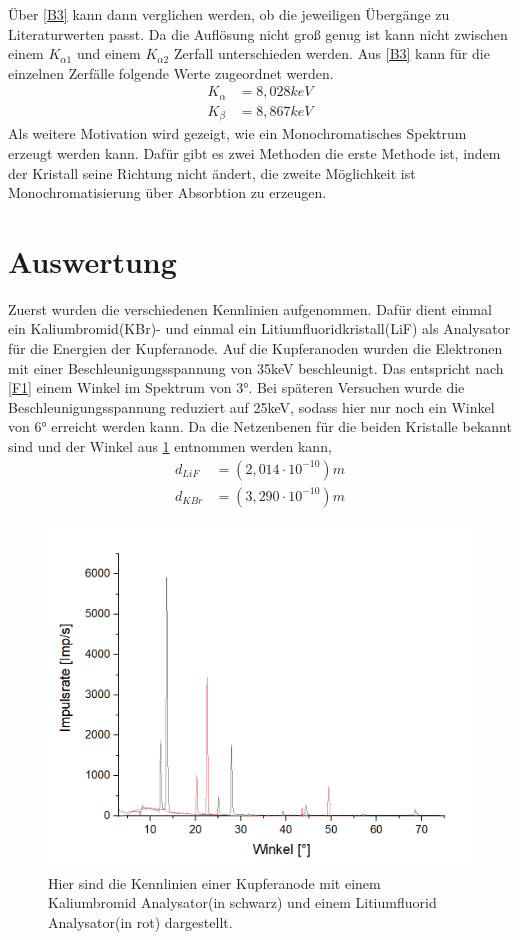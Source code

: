 \documentclass[
	a4paper,
	12pt,
	pagesize,
	ngerman
]{scrartcl}
\begin{document}
Über \cref{B3} kann dann verglichen werden, ob die jeweiligen Übergänge zu Literaturwerten passt. Da die Auflösung nicht groß genug ist kann nicht zwischen einem $K_{\alpha1}$ und einem $K_{\alpha2}$ Zerfall unterschieden werden. Aus \cref{B3} kann für die einzelnen Zerfälle folgende Werte zugeordnet werden.
\begin{align*}
    K_{\alpha} &= 8,028 keV \\
    K_{\beta} &= 8,867 keV
\end{align*}
Als weitere Motivation wird gezeigt, wie ein Monochromatisches Spektrum erzeugt werden kann. Dafür gibt es zwei Methoden die erste Methode ist, indem der Kristall seine Richtung nicht ändert, die zweite Möglichkeit ist Monochromatisierung über Absorbtion zu erzeugen.


\section{Auswertung}
Zuerst wurden die verschiedenen Kennlinien aufgenommen. Dafür dient einmal ein Kaliumbromid(KBr)- und einmal ein Litiumfluoridkristall(LiF) als Analysator für die Energien der Kupferanode. Auf die Kupferanoden wurden die Elektronen mit einer Beschleunigungsspannung von 35keV beschleunigt. Das entspricht nach \cref{F1} einem Winkel im Spektrum von 3°. Bei späteren Versuchen wurde die Beschleunigungsspannung reduziert auf 25keV, sodass hier nur noch ein Winkel von 6° erreicht werden kann. Da die Netzenbenen für die beiden Kristalle bekannt sind und der Winkel aus \cref{A1} entnommen werden kann,
\begin{align*}
    d_{LiF} &= (2,014 \cdot 10^{-10})m \\
    d_{KBr} &= (3,290 \cdot 10^{-10})m  
\end{align*}
\begin{figure}[h!]
    \centering
    \includegraphics[scale = 0.6]{lif-kbr.png}
    \caption{Hier sind die Kennlinien einer Kupferanode mit einem Kaliumbromid Analysator(in schwarz) und einem Litiumfluorid Analysator(in rot) dargestellt.}
    \label{A1}
\end{figure}
\end{document}
